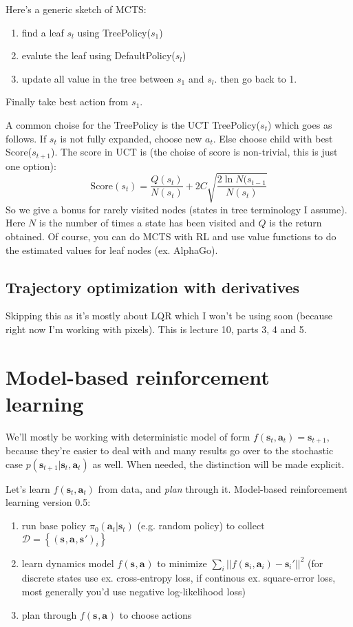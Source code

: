\documentclass{report}
\begin{document}
Here's a generic sketch of MCTS:
\begin{enumerate}
		\item find a leaf $s_l$ using TreePolicy($s_1$)
		\item evalute the leaf using DefaultPolicy($s_l$)
		\item update all value in the tree between $s_1$ and $s_l$. then go back to 1.
\end{enumerate}
Finally take best action from $s_1$.

A common choise for the TreePolicy is the UCT TreePolicy($s_t$)
which goes as follows. If $s_t$ is not fully expanded, choose new $a_t$. Else 
choose child with best Score($s_{t+1}$).
The score in UCT is (the choise of score is non-trivial, this is just one option):
\begin{equation}
		\text{Score}(s_t) = \frac{Q(s_t)}{N(s_t)} + 2C \sqrt{ \frac{2 \ln N(s_{t-1}}{N(s_t)}  } 
\end{equation}
So we give a bonus for rarely visited nodes (states in tree terminology I assume).
Here $N$ is the number of times a state has been visited and $Q$ is the return obtained.
Of course, you can do MCTS with RL and use value functions to do the estimated values for leaf nodes (ex. AlphaGo).

\subsection{Trajectory optimization with derivatives}
Skipping this as it's mostly about LQR which I won't be using soon (because right now I'm working with pixels).
This is lecture 10, parts 3, 4 and 5.

\section{Model-based reinforcement learning}
We'll mostly be working with deterministic model of form $f (\bm{s}_{t}, \bm{a}_{t} ) = \bm{s}_{t+1} $,
because they're easier to deal with and many results go over to the stochastic case 
$p(\bm{s}_{t+1} | \bm{s}_t, \bm{a}_t)$
as well. When needed, the distinction will be made explicit.

Let's learn $ f (\bm{s}_{t}, \bm{a}_{t} )$ from data, and \textit{plan} through it.
Model-based reinforcement learning version 0.5:
\begin{enumerate}
		\item run base policy $ \pi_0 (\bm{a}_t| \bm{s}_t)  $ (e.g. random policy) to collect $ \mathcal{D} = \left\{ \left( \bm{s}_{}, \bm{a}_{}, \bm{s}_{}' \right)_i  \right\}  $ 
		\item learn dynamics model $f(\bm{s}_{}, \bm{a}_{})$ to minimize $ \sum_{i}^{} || f (\bm{s}_{i}, \bm{a}_{i} ) - \bm{s}_{i}'||^2$ 
				(for discrete states use ex. cross-entropy loss, if continous ex. square-error loss, most generally you'd use negative log-likelihood loss)
		\item plan through $f(\bm{s}_{}, \bm{a}_{})$ to choose actions
\end{enumerate}
\end{document}
